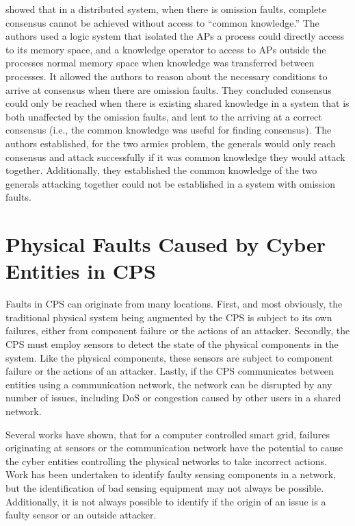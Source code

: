 \cite{knowledge-distributed} showed that in a distributed system, when there is omission faults, complete consensus cannot be achieved without access to ``common knowledge.''
The authors used a logic system that isolated the \acp{AP} a process could directly access to its memory space, and a knowledge operator to access to \acp{AP} outside the processes normal memory space when knowledge was transferred between processes.
It allowed the authors to reason about the necessary conditions to arrive at consensus when there are omission faults.
They concluded consensus could only be reached when there is existing shared knowledge in a system that is both unaffected by the omission faults, and lent to the arriving at a correct consensus (i.e., the common knowledge was useful for finding consensus).
The authors established, for the two armies problem, the generals would only reach consensus and attack successfully if it was common knowledge they would attack together.
Additionally, they established the common knowledge of the two generals attacking together could not be established in a system with omission faults.

\section{Physical Faults Caused by Cyber Entities in CPS}

Faults in \ac{CPS} can originate from many locations.
First, and most obviously, the traditional physical system being augmented by the CPS is subject to its own failures, either from component failure or the actions of an attacker.
Secondly, the \ac{CPS} must employ sensors to detect the state of the physical components in the system.
Like the physical components, these sensors are subject to component failure or the actions of an attacker.
Lastly, if the \ac{CPS} communicates between entities using a communication network, the network can be disrupted by any number of issues, including DoS or congestion caused by other users in a shared network.

Several works have shown\cite{Roth2012}\cite{HARINI}\cite{CYBERRESEARCHCALL}, that for a computer controlled smart grid, failures originating at sensors or the communication network have the potential to cause the cyber entities controlling the physical networks to take incorrect actions.
Work has been undertaken to identify faulty sensing components in a network, but the identification of bad sensing equipment may not always be possible.
Additionally, it is not always possible to identify if the origin of an issue is a faulty sensor or an outside attacker.

